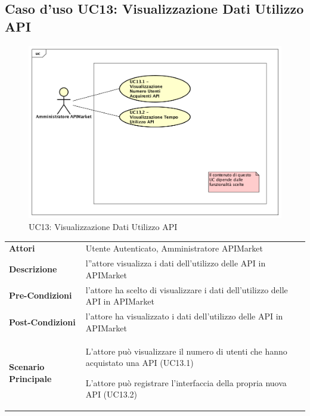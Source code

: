 \newpage
\subsection{Caso d'uso UC13: Visualizzazione Dati Utilizzo API}
\label{UC13}
\begin{figure}[ht]
	\centering
	\includegraphics[scale=0.45]{UML/UC13.png}
	\caption{UC13: Visualizzazione Dati Utilizzo API}
\end{figure}

\renewcommand*{\arraystretch}{1.6}
\begin{longtable}{ l | p{11cm}}
	\hline
	\rowcolor{Gray}
	\multicolumn{2}{c}{UC13: Visualizzazione Dati Utilizzo API} \\
	\hline
	\textbf{Attori} &Utente Autenticato, Amministratore APIMarket \\
	\textbf{Descrizione} &l''attore visualizza i dati dell'utilizzo delle API in APIMarket \\
	\textbf{Pre-Condizioni} &   l'attore ha scelto di visualizzare i dati dell'utilizzo delle API in APIMarket\\
	\textbf{Post-Condizioni}& l'attore ha visualizzato i dati dell'utilizzo delle API in APIMarket\\
	\textbf{Scenario Principale} & \begin{enumerate*}[label=(\arabic*.),itemjoin={\newline}]
		\item L'attore può visualizzare il numero di utenti che hanno acquistato una API (UC13.1)
		\item L'attore può registrare l'interfaccia della propria nuova API (UC13.2)
	\end{enumerate*}\\
\end{longtable}





